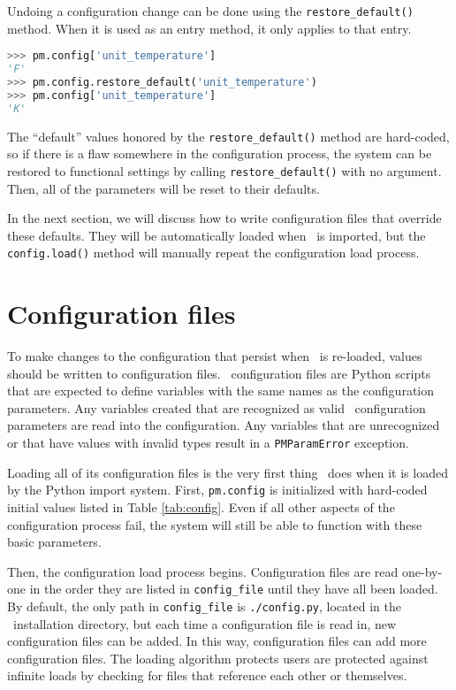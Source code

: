 Undoing a configuration change can be done using the {\texttt{restore\_default()}} method.  When it is used as an entry method, it only applies to that entry.
\begin{lstlisting}[language=Python]
>>> pm.config['unit_temperature']
'F'
>>> pm.config.restore_default('unit_temperature')
>>> pm.config['unit_temperature']
'K'
\end{lstlisting}
The ``default'' values honored by the \texttt{restore\_default()} method are hard-coded, so if there is a flaw somewhere in the configuration process, the system can be restored to functional settings by calling \linebreak\texttt{restore\_default()} with no argument.  Then, all of the parameters will be reset to their defaults.

In the next section, we will discuss how to write configuration files that override these defaults.  They will be automatically loaded when \PM\ is imported, but the \verb|config.load()| method will manually repeat the configuration load process.

\section{Configuration files}

To make changes to the configuration that persist when \PM\ is re-loaded, values should be written to configuration files.  \PM\ configuration files are Python scripts that are expected to define variables with the same names as the configuration parameters.  Any variables created that are recognized as valid \PM\ configuration parameters are read into the configuration.  Any variables that are unrecognized or that have values with invalid types result in a \texttt{PMParamError} exception.

Loading all of its configuration files is the very first thing \PM\ does when it is loaded by the Python import system.  First, \texttt{pm.config} is initialized with hard-coded initial values listed in Table \ref{tab:config}.  Even if all other aspects of the configuration process fail, the system will still be able to function with these basic parameters. 

Then, the configuration load process begins.  Configuration files are read one-by-one in the order they are listed in \verb|config_file| until they have all been loaded.  By default, the only path in \verb|config_file| is \texttt{./config.py}, located in the \PM\ installation directory, but each time a configuration file is read in, new configuration files can be added.  In this way, configuration files can add more configuration files.  The loading algorithm protects users are protected against infinite loads by checking for files that reference each other or themselves.


